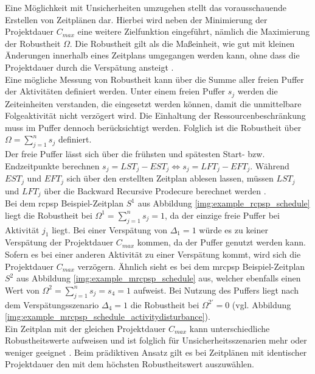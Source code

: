 Eine Möglichkeit mit Unsicherheiten umzugehen stellt das vorausschauende Erstellen von Zeitplänen dar. Hierbei wird neben der Minimierung der Projektdauer $C_{max}$ eine weitere Zielfunktion eingeführt, nämlich die Maximierung der Robustheit $\Omega$. Die Robustheit gilt als die Maßeinheit, wie gut mit kleinen Änderungen innerhalb eines Zeitplans umgegangen werden kann, ohne dass die Projektdauer durch die Verspätung ansteigt \cite[vgl.][S. 246]{khemakhem_efficient_2013} \cite[vgl.][S. 177]{al-fawzan_bi-objective_2005}. \\

Eine mögliche Messung von Robustheit kann über die Summe aller freien Puffer der Aktivitäten definiert werden. Unter einem freien Puffer $s_j$ werden die Zeiteinheiten verstanden, die eingesetzt werden können, damit die unmittelbare Folgeaktivität nicht verzögert wird. Die Einhaltung der Ressourcenbeschränkung muss im Puffer dennoch berücksichtigt werden. Folglich ist die Robustheit über $\Omega = \sum_{j=1}^n s_j$ definiert. \cite[vgl.][S. 177]{al-fawzan_bi-objective_2005} \\

Der freie Puffer lässt sich über die frühsten und spätesten Start- bzw. Endzeitpunkte berechnen $s_j = LST_j - EST_j \Leftrightarrow s_j = LFT_j - EFT_j$. Während $EST_j$ und $EFT_j$ sich über den erstellten Zeitplan ablesen lassen, müssen $LST_j$ und $LFT_j$ über die Backward Recursive Prodecure berechnet werden \cite[vgl.][S. 181]{al-fawzan_bi-objective_2005}. \\

Bei dem \ac{rcpsp} Beispiel-Zeitplan $S^1$ aus Abbildung \ref{img:example_rcpsp_schedule} liegt die Robustheit bei $\Omega^1 = \sum_{j=1}^n s_j = 1$, da der einzige freie Puffer bei Aktivität $j_1$ liegt. Bei einer Verspätung von $\Delta_1 = 1$ würde es zu keiner Verspätung der Projektdauer $C_{max}$ kommen, da der Puffer genutzt werden kann. Sofern es bei einer anderen Aktivität zu einer Verspätung kommt, wird sich die Projektdauer $C_{max}$ verzögern. Ähnlich sieht es bei dem \ac{mrcpsp} Beispiel-Zeitplan $S^2$ aus Abbildung \ref{img:example_mrcpsp_schedule} aus, welcher ebenfalls einen Wert von $\Omega^2 = \sum_{j=1}^n s_j = s_4 = 1$ aufweist. Bei Nutzung des Puffers liegt nach dem Verspätungsszenario $\Delta_4 = 1$ die Robustheit bei $\Omega^{2'} = 0$ (vgl. Abbildung \ref{img:example_mrcpsp_schedule_activitydisturbance}). \\

Ein Zeitplan mit der gleichen Projektdauer $C_{max}$ kann unterschiedliche Robustheitswerte aufweisen und ist folglich für Unsicherheitsszenarien mehr oder weniger geeignet \cite[vgl.][S. 178]{al-fawzan_bi-objective_2005}. Beim prädiktiven Ansatz gilt es bei Zeitplänen mit identischer Projektdauer den mit dem höchsten Robustheitswert auszuwählen. \\


